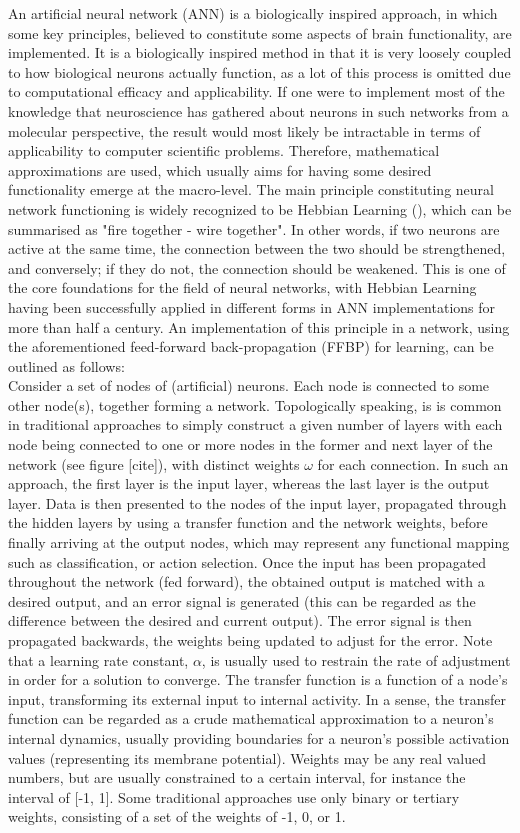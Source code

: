 An artificial neural network (ANN) is a biologically inspired approach, in which some key principles, believed to constitute some aspects of brain functionality, are implemented. It is a biologically inspired method in that it is very loosely coupled to how biological neurons actually function, as a lot of this process is omitted due to computational efficacy and applicability. If one were to implement most of the knowledge that neuroscience has gathered about neurons in such networks from a molecular perspective, the result would most likely be intractable in terms of applicability to computer scientific problems. Therefore, mathematical approximations are used, which usually aims for having some desired functionality emerge at the macro-level. The main principle constituting neural network functioning is widely recognized to be Hebbian Learning (\cite{Hebb1949}), which can be summarised as "fire together - wire together". In other words, if two neurons are active at the same time, the connection between the two should be strengthened, and conversely; if they do not, the connection should be weakened. This is one of the core foundations for the field of neural networks, with Hebbian Learning having been successfully applied in different forms in ANN implementations for more than half a century. An implementation of this principle in a network, using the aforementioned feed-forward back-propagation (FFBP) for learning, can be outlined as follows:
\\
Consider a set of nodes of (artificial) neurons. Each node is connected to some other node(s), together forming a network. Topologically speaking, is is common in traditional approaches to simply construct a given number of layers with each node being connected to one or more nodes in the former and next layer of the network (see figure [cite]), with distinct weights $\omega$ for each connection. In such an approach, the first layer is the input layer, whereas the last layer is the output layer. Data is then presented to the nodes of the input layer, propagated through the hidden layers by using a transfer function and the network weights, before finally arriving at the output nodes, which may represent any functional mapping such as classification, or action selection. Once the input has been propagated throughout the network (fed forward), the obtained output is matched with a desired output, and an error signal is generated (this can be regarded as the difference between the desired and current output). The error signal is then propagated backwards, the weights being updated to adjust for the error. Note that a learning rate constant, $\alpha$, is usually used to restrain the rate of adjustment in order for a solution to converge.
The transfer function is a function of a node's input, transforming its external input to internal activity. In a sense, the transfer function can be regarded as a crude mathematical approximation to a neuron's internal dynamics, usually providing boundaries for a neuron's possible activation values (representing its membrane potential). Weights may be any real valued numbers, but are usually constrained to a certain interval, for instance the interval of [-1, 1]. Some traditional approaches use only binary or tertiary weights, consisting of a set of the weights of -1, 0, or 1.

